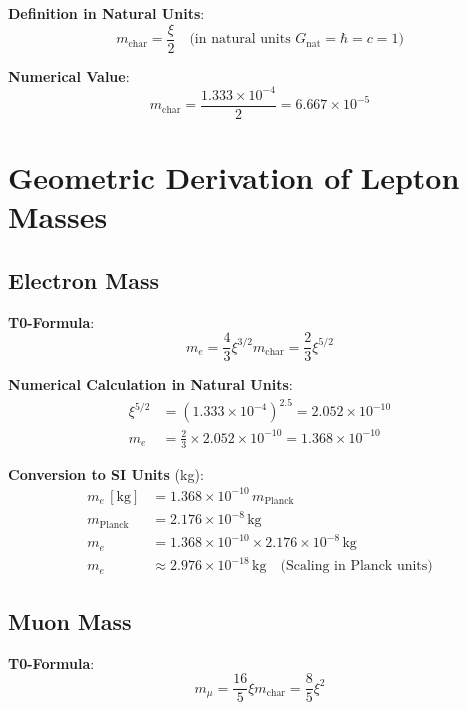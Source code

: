 \documentclass[12pt,a4paper]{article}
\newcommand{\xipar}{\xi}
\newcommand{\mchar}{m_{\text{char}}}
\begin{document}
	\textbf{Definition in Natural Units}:
	\begin{equation}
		\mchar = \frac{\xipar}{2} \quad \text{(in natural units } G_{\text{nat}} = \hbar = c = 1\text{)}
	\end{equation}
	
	\textbf{Numerical Value}:
	\begin{equation}
		\mchar = \frac{1{.}333 \times 10^{-4}}{2} = 6{.}667 \times 10^{-5}
	\end{equation}
	
	\section{Geometric Derivation of Lepton Masses}
	
	\subsection{Electron Mass}
	
	\textbf{T0-Formula}:
	\begin{equation}
		m_e = \frac{4}{3} \xipar^{3/2} \mchar = \frac{2}{3} \xipar^{5/2}
	\end{equation}
	
	\textbf{Numerical Calculation in Natural Units}:
	\begin{align}
		\xipar^{5/2} &= (1{.}333 \times 10^{-4})^{2{.}5} = 2{.}052 \times 10^{-10} \\
		m_e &= \frac{2}{3} \times 2{.}052 \times 10^{-10} = 1{.}368 \times 10^{-10}
	\end{align}
	
	\textbf{Conversion to SI Units} (kg):
	\begin{align}
		m_e \,[\text{kg}] &= 1{.}368 \times 10^{-10} \, m_\text{Planck} \\
		m_\text{Planck} &= 2{.}176 \times 10^{-8}\,\text{kg} \\
		m_e &= 1{.}368 \times 10^{-10} \times 2{.}176 \times 10^{-8} \,\text{kg} \\
		m_e &\approx 2{.}976 \times 10^{-18}\,\text{kg} \quad \text{(Scaling in Planck units)}
	\end{align}
	
	\subsection{Muon Mass}
	
	\textbf{T0-Formula}:
	\begin{equation}
		m_\mu = \frac{16}{5} \xipar \mchar = \frac{8}{5} \xipar^2
	\end{equation}
	
\end{document}
